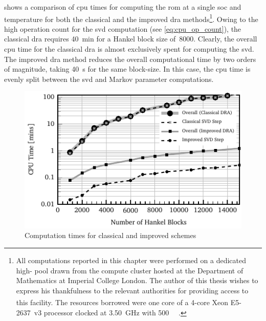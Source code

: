   shows   a  comparison  of  \gls{cpu}   times  for  computing
the   \gls{rom}  at   a  single   \gls{soc}   and  temperature   for  both   the
classical  and  the improved  \gls{dra}  methods\footnote{\label{fn:clusterspec}
All  computations  reported  in  this  chapter were  performed  on  a  dedicated
high-  pool  drawn  from  the compute  cluster  hosted  at  the
Department  of  Mathematics at  Imperial  College  London.  The author  of  this
thesis  wishes  to   express  his  thankfulness  to   the  relevant  authorities
for  providing  access  to  this  facility.  The  resources  borrowed  were  one
core  of  a  \mbox{4-core}  \mbox{\textsuperscript{\textregistered}}
\mbox{Xeon\textsuperscript{\textregistered}} \mbox{E5-2637~v3} processor clocked
at   \SI{3.50}{\giga\hertz}   with   \SI{500}{\giga\byte}   .}.
Owing   to   the   high   operation  count   for   the   \gls{svd}   computation
(see   \cref{eq:cpu_op_count}),  the   classical   \gls{dra}  requires   \approx
\SI{40}{\minute} for a Hankel block size of~8000. Clearly, the overall \gls{cpu}
time for the  classical \gls{dra} is almost exclusively spent  for computing the
\gls{svd}. The improved \gls{dra} method  reduces the overall computational time
by  two  orders of  magnitude,  taking  \approx  \SI{40}{\second} for  the  same
block-size.  In this  case,  the  \gls{cpu} time  is  evenly  split between  the
\gls{svd} and Markov parameter computations.

\begin{figure}[!htbp]
    \centering
    \includegraphics{cpu_usage.pdf}
    \caption{Computation times for classical and improved  schemes}
    \label{fig:cputime}
\end{figure}

